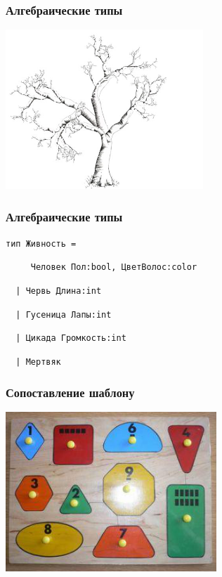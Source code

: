 \documentclass{beamer}
\begin{document}
\begin{frame}
  \frametitle{Алгебраические типы}
  \begin{center}
    \includegraphics[height=6cm]{tree.png}
  \end{center}
\end{frame}

\begin{frame}[fragile]
  \frametitle{Алгебраические типы}
  \begin{block}{}
    \texttt{{\color{magenta}тип} {\color{blue}Живность} =}
      \pause

      \verb+    +\texttt{{\color{blue} Человек} Пол:{\color{magenta}bool}, ЦветВолос:{\color{magenta}color}}
      \pause

      \verb+  +\texttt{| {\color{blue}Червь} Длина:{\color{magenta}int}}
      \pause

      \verb+  +\texttt{| {\color{blue}Гусеница} Лапы:{\color{magenta}int}}
      \pause

      \verb+  +\texttt{| {\color{blue}Цикада} Громкость:{\color{magenta}int}}
      \pause

      \verb+  +\texttt{| {\color{blue}Мертвяк}}
  \end{block}
\end{frame}

\begin{frame}
  \frametitle{Сопоставление шаблону}
  \begin{center}
    \includegraphics[height=6cm]{pm.png}
  \end{center}
\end{frame}
\end{document}
